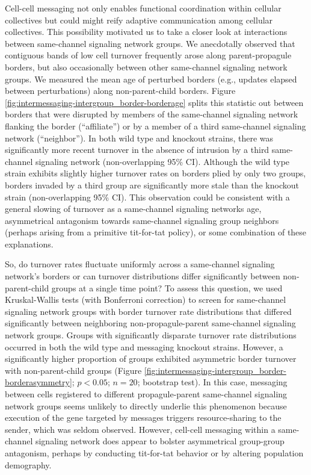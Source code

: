 Cell-cell messaging not only enables functional coordination within cellular collectives but could might reify adaptive communication among cellular collectives.
This possibility motivated us to take a closer look at interactions between same-channel signaling network groups.
We anecdotally observed that contiguous bands of low cell turnover frequently arose along parent-propagule borders, but also occasionally between other same-channel signaling network groups.
We measured the mean age of perturbed borders (e.g., updates elapsed between perturbations) along non-parent-child borders.
Figure \ref{fig:intermessaging-intergroup_border-borderage} splits this statistic out between borders that were disrupted by members of the same-channel signaling network flanking the border (``affiliate'') or by a member of a third same-channel signaling network (``neighbor'').
In both wild type and knockout strains, there was significantly more recent turnover in the absence of intrusion by a third same-channel signaling network (non-overlapping 95\% CI).
Although the wild type strain exhibits slightly higher turnover rates on borders plied by only two groups, borders invaded by a third group are significantly more stale than the knockout strain (non-overlapping 95\% CI).
This observation could be consistent with a general slowing of turnover as a same-channel signaling networks age, asymmetrical antagonism towards same-channel signaling group neighbors (perhaps arising from a primitive tit-for-tat policy), or some combination of these explanations.

So, do turnover rates fluctuate uniformly across a same-channel signaling network's borders or can turnover distributions differ significantly between non-parent-child groups at a single time point?
To assess this question, we used Kruskal-Wallis tests (with Bonferroni correction) to screen for same-channel signaling network groups with border turnover rate distributions that differed significantly between neighboring non-propagule-parent same-channel signaling network groups.
Groups with significantly disparate turnover rate distributions occurred in both the wild type and messaging knockout strains.
However, a significantly higher proportion of groups exhibited asymmetric border turnover with non-parent-child groups (Figure \ref{fig:intermessaging-intergroup_border-borderasymmetry}; $p < 0.05$; $n=20$; bootstrap test).
In this case, messaging between cells registered to different propagule-parent same-channel signaling network groups seems unlikely to directly underlie this phenomenon because execution of the gene targeted by messages triggers resource-sharing to the sender, which was seldom observed.
However, cell-cell messaging within a same-channel signaling network does appear to bolster asymmetrical group-group antagonism, perhaps by conducting tit-for-tat behavior or by altering population demography.

